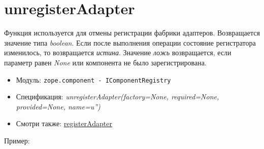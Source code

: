 \documentclass[a4paper,openany,twoside,final]{book}
\providecommand*{\DUroletitlereference}[1]{\textsl{#1}}
\begin{document}
\section*{unregisterAdapter%
  \label{unregisteradapter}%
}

Функция используется для отмены регистрации фабрики адаптеров.  Возвращается значение типа \DUroletitlereference{boolean}.  Если после выполнения операции состояние регистратора изменилось, то возвращается \DUroletitlereference{истина}.  Значение \DUroletitlereference{ложь} возвращается, если параметр равен \DUroletitlereference{None} или компонента не было зарегистрирована.

\begin{itemize}

\item Модуль: \texttt{zope.component - IComponentRegistry}

\item Спецификация: \DUroletitlereference{unregisterAdapter(factory=None, required=None, provided=None, name=u'')}

\item Смотри также: \hyperref[registeradapter]{registerAdapter}

\end{itemize}

Пример:
\end{document}
